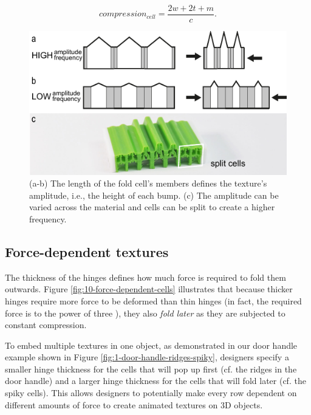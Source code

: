 \[
    compression_{cell} = \frac{2w + 2t + m}{c}.
\]


\begin{figure} [h]  
    \includegraphics[width=\textwidth]{chapters/metamaterial-textures-FIG/9-amplitude-frequency.pdf}
    \caption[Short figure name.]{(a-b) The length of the fold cell’s members defines the texture’s amplitude, i.e., the height of each bump. (c) The amplitude can be varied across the material and cells can be split to create a higher frequency.
    \label{fig:9-amplitude-frequency}}
\end{figure}


\subsection{Force-dependent textures}
\label{section:force-dependent-textures}

The thickness of the hinges defines how much force is required to fold them outwards. Figure \ref{fig:10-force-dependent-cells} illustrates that because thicker hinges require more force to be deformed than thin hinges (in fact, the required force is to the power of three \cite{Gross2014}), they also \textit{fold later} as they are subjected to constant compression. 

To embed multiple textures in one object, as demonstrated in our door handle example shown in Figure \ref{fig:1-door-handle-ridges-spiky}, designers specify a smaller hinge thickness for the cells that will pop up first (cf. the ridges in the door handle) and a larger hinge thickness for the cells that will fold later (cf. the spiky cells). This allows designers to potentially make every row dependent on different amounts of force to create animated textures on 3D objects. 

